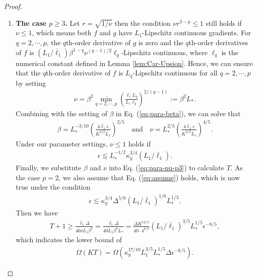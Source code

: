 \begin{proof}
\begin{enumerate}
\begin{align*}
    \frac{\bar \ell_1 \Delta}{40 \nu L_1 \beta^2} = \frac{\ell_2 \Delta}{40 \beta^3 L_2  }  = \frac{\Delta K^{18/7}}{40 \cdot 4^{12/7}} ( L_1 / \bar \ell_1 )^{3/7} (L_2/ \ell_2)^{2/7} \epsilon^{-12/7},
\end{align*}
which indicates the lower bound of
\begin{align*}
    \Omega(K T) = \Omega ( \kappa_y^{25/14}  L_1^{3/7} L_2^{2/7} \Delta \epsilon^{-12/7}    ).
\end{align*}
\item \textbf{The case $p \ge 3$.} Let $r = \sqrt{1/\nu}$ then the condition $\nu r^{3-p} \le 1$ still holds if $\nu \le 1$, which means both $f$ and $g$ have $L_1$-Lipschitz continuous gradients.
For $q = 2,\cdots,p$, the $q$th-order derivative of $g$ is zero and 
the $q$th-order derivatives of $f$ is $ (L_1/\bar \ell_1) \beta^{1-q} \nu^{(q-1)/2} \ell_q$-Lipschitz continuous, where $\ell_q$ is the numerical constant defined in Lemma \ref{lem:Car-Upsion}.
Hence, we can ensure that the $q$th-order derivative of $f$ is $L_q$-Lipschitz continuous for all $q = 2,\cdots,p$ by setting 
\begin{align} \label{eq:para-nu-p3}
    \nu =  \beta^2  \min_{q=2, \cdots, p}  \left( \frac{\bar \ell_1 L_q}{L_1 \ell_q} \right)^{2/(q-1)} := \beta^2 L_*.
\end{align}
Combining with the setting of $\beta$ in Eq. (\ref{eq:para-beta}), we can solve that
\begin{align*}
    \beta = L_*^{-3/10}\left( \frac{4 \bar \ell_1 \epsilon}{K^{3/2} L_1
    } \right)^{2/5} \quad {\text{and}} \quad \nu = L_*^{2/5} \left( \frac{4 \bar \ell_1 \epsilon}{K^{3/2} L_1 } \right)^{4/5}.
\end{align*}
Under our parameter settings, $\nu \le 1$  holds if
\begin{align*}
    \epsilon \lesssim 
    L_*^{-1/2}\kappa_y^{3/4} ( L_1/{\bar \ell_1}).
\end{align*}
Finally, we substitute $\beta$ and $\nu$ into Eq. (\ref{eq:para-nu-p3}) to calculate $T$. As the case $p=2$, we also assume that Eq. (\ref{eq:assume}) holds, 
which is now true under the condition
\begin{align*}
    \epsilon \lesssim \kappa_y^{3/4} \Delta^{5/6} (L_1 / \bar \ell_1)^{1/6} L_*^{1/3}.
\end{align*}
Then we have
\begin{align*}
    T+1 \ge  
    \frac{\bar \ell_1 \Delta}{40 \nu L_1 \beta^2} = \frac{\bar \ell_1 \Delta}{40 L_1 \beta^4 L_*} = \frac{\Delta K^{12/5}}{40 \cdot 4^{8/5}} (L_1 / \bar \ell_1 )^{3/5} L_*^{1/5} \epsilon^{-8/5},
\end{align*}
which indicates the lower bound of
\begin{align*}
    \Omega(K T) = \Omega ( \kappa_y^{17/10} L_1^{3/5} L_*^{1/5} \Delta \epsilon^{-8/5} ).
\end{align*}
\end{enumerate}

\end{proof}

